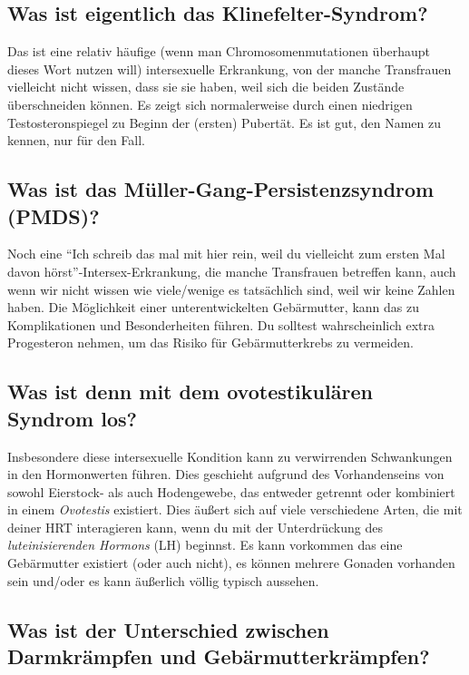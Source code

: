 \documentclass{article}
\begin{document}
{{{\subsection{Was ist eigentlich das Klinefelter-Syndrom?}

Das ist eine relativ häufige (wenn man Chromosomenmutationen überhaupt dieses Wort nutzen will) intersexuelle Erkrankung, von der manche Transfrauen vielleicht nicht wissen, dass sie sie haben, weil sich die beiden Zustände überschneiden können. Es zeigt sich normalerweise durch einen niedrigen Testosteronspiegel zu Beginn der (ersten) Pubertät. Es ist gut, den Namen zu kennen, nur für den Fall.

\subsection{Was ist das Müller-Gang-Persistenzsyndrom (PMDS)?}

Noch eine “Ich schreib das mal mit hier rein, weil du vielleicht zum ersten Mal davon hörst”-Intersex-Erkrankung, die manche Transfrauen betreffen kann, auch wenn wir nicht wissen wie viele/wenige es tatsächlich sind, weil wir keine Zahlen haben. Die Möglichkeit einer unterentwickelten Gebärmutter, kann das zu Komplikationen und Besonderheiten führen. Du solltest wahrscheinlich extra Progesteron nehmen, um das Risiko für Gebärmutterkrebs zu vermeiden.

\subsection{Was ist denn mit dem ovotestikulären Syndrom los?}

Insbesondere diese intersexuelle Kondition kann zu verwirrenden Schwankungen in den Hormonwerten führen. Dies geschieht aufgrund des Vorhandenseins von sowohl Eierstock- als auch Hodengewebe, das entweder getrennt oder kombiniert in einem \textit{Ovotestis} existiert. Dies äußert sich auf viele verschiedene Arten, die mit deiner HRT interagieren kann, wenn du mit der Unterdrückung des \textit{luteinisierenden Hormons} (LH) beginnst. Es kann vorkommen das eine Gebärmutter existiert (oder auch nicht), es können mehrere Gonaden vorhanden sein und/oder es kann äußerlich völlig typisch aussehen.

\subsection{Was ist der Unterschied zwischen Darmkrämpfen und Gebärmutterkrämpfen?}\label{11-35}

}}}
\end{document}
